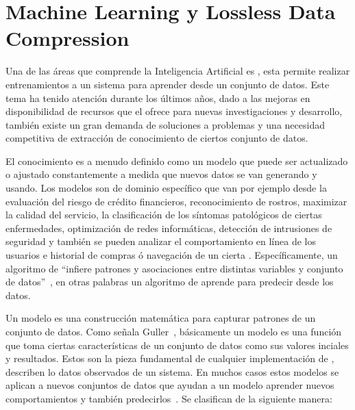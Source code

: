 \chapter[Machine Learning y Lossless Data Compression]{Machine Learning y Lossless Data Compression}\label{ch:Compresion-Machine-Learning}


Una de las áreas que comprende la Inteligencia Artificial es \machinelearning, esta permite realizar entrenamientos a un sistema para aprender desde un conjunto de datos. Este tema ha tenido atención durante los últimos años, dado a las mejoras en disponibilidad de recursos que el \cloudcomputing ofrece para nuevas investigaciones y desarrollo, también existe un gran demanda de soluciones a problemas y una necesidad competitiva de extracción de conocimiento de ciertos conjunto de datos.

El conocimiento es a menudo definido como un modelo que puede ser actualizado o ajustado constantemente a medida que nuevos datos se van generando y usando. Los modelos son  de dominio específico que van por ejemplo desde la evaluación del riesgo de crédito financieros, reconocimiento de rostros, maximizar la calidad del servicio, la clasificación de los síntomas patológicos de ciertas enfermedades, optimización de redes informáticas, detección de intrusiones de seguridad y también se pueden analizar el comportamiento en línea de los usuarios e historial de compras ó navegación  de un cierta \webs. Específicamente, un algoritmo de \machinelearning ``infiere patrones y asociaciones entre distintas variables y conjunto de datos''~\cite[capítulo 8]{guller2015big}, en otras palabras un algoritmo de \machinelearning aprende para predecir desde los datos. 


Un modelo es una construcción matemática para capturar patrones de un conjunto de datos. Como señala Guller~\MLGuller, básicamente un modelo es una función que toma ciertas características de un conjunto de datos como sus valores inciales y resultados.  Estos son la pieza fundamental de cualquier implementación de \machinelearning, describen lo datos observados de un sistema. En muchos casos estos modelos se aplican a nuevos conjuntos de datos  que ayudan a un modelo aprender nuevos comportamientos y también predecirlos~\MLPDASunila. Se clasifican de la siguiente manera:

